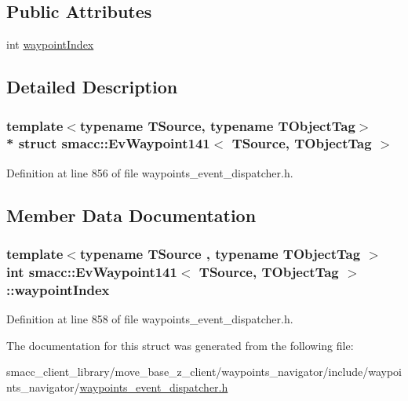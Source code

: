 \subsection*{Public Attributes}
\begin{DoxyCompactItemize}
\item 
int \hyperlink{structsmacc_1_1EvWaypoint141_adeb1c60b0e112328ed4efac93c99e18e}{waypoint\+Index}
\end{DoxyCompactItemize}


\subsection{Detailed Description}
\subsubsection*{template$<$typename T\+Source, typename T\+Object\+Tag$>$\\*
struct smacc\+::\+Ev\+Waypoint141$<$ T\+Source, T\+Object\+Tag $>$}



Definition at line 856 of file waypoints\+\_\+event\+\_\+dispatcher.\+h.



\subsection{Member Data Documentation}
\subsubsection[{\texorpdfstring{waypoint\+Index}{waypointIndex}}]{\setlength{\rightskip}{0pt plus 5cm}template$<$typename T\+Source , typename T\+Object\+Tag $>$ int {\bf smacc\+::\+Ev\+Waypoint141}$<$ T\+Source, T\+Object\+Tag $>$\+::waypoint\+Index}\hypertarget{structsmacc_1_1EvWaypoint141_adeb1c60b0e112328ed4efac93c99e18e}{}\label{structsmacc_1_1EvWaypoint141_adeb1c60b0e112328ed4efac93c99e18e}


Definition at line 858 of file waypoints\+\_\+event\+\_\+dispatcher.\+h.



The documentation for this struct was generated from the following file\+:\begin{DoxyCompactItemize}
\item 
smacc\+\_\+client\+\_\+library/move\+\_\+base\+\_\+z\+\_\+client/waypoints\+\_\+navigator/include/waypoints\+\_\+navigator/\hyperlink{waypoints__event__dispatcher_8h}{waypoints\+\_\+event\+\_\+dispatcher.\+h}\end{DoxyCompactItemize}
